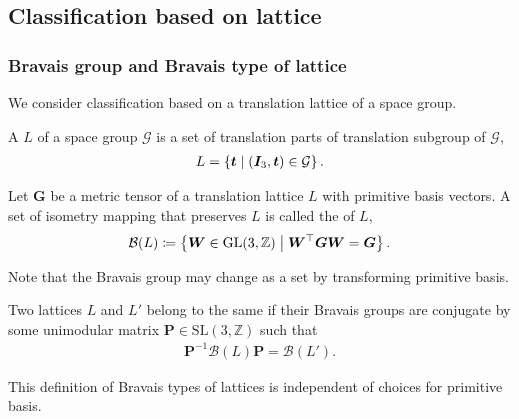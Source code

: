 \subsection{\label{sec:bravais-class}Classification based on lattice}

\subsubsection{Bravais group and Bravais type of lattice}

We consider classification based on a translation lattice of a space group.

\begin{screen}
  \begin{defn}
    A  $L$ of a space group $\mathcal{G}$ is a set of translation parts of translation subgroup of $\mathcal{G}$,
    \begin{align}
      L = \left\{  \bm{t}  \mathrel{}\middle|\mathrel{}  (\bm{I}_{3}, \bm{t}) \in \mathcal{G}  \right\}.
    \end{align}
  \end{defn}
\end{screen}

\begin{screen}
  \begin{defn}
    Let $\bm{G}$ be a metric tensor of a translation lattice $L$ with primitive basis vectors.
    A set of isometry mapping that preserves $L$ is called the  of $L$,
    \begin{align}
      \mathcal{B}(L) \coloneqq \left\{  \bm{W} \in \mathrm{GL}(3, \mathbb{Z})  \mathrel{}\middle|\mathrel{}  \bm{W}^{\top}\bm{GW} = \bm{G}  \right\}.
    \end{align}
  \end{defn}
\end{screen}

Note that the Bravais group may change as a set by transforming primitive basis.

\begin{screen}
  \begin{defn}
    Two lattices $L$ and $L'$ belong to the same  if their Bravais groups are conjugate by some unimodular matrix $\bm{P} \in \mathrm{SL}(3, \mathbb{Z})$ such that
    \begin{align}
       \bm{P}^{-1} \mathcal{B}(L) \bm{P} = \mathcal{B}(L').
    \end{align}
  \end{defn}
\end{screen}
This definition of Bravais types of lattices is independent of choices for primitive basis.


